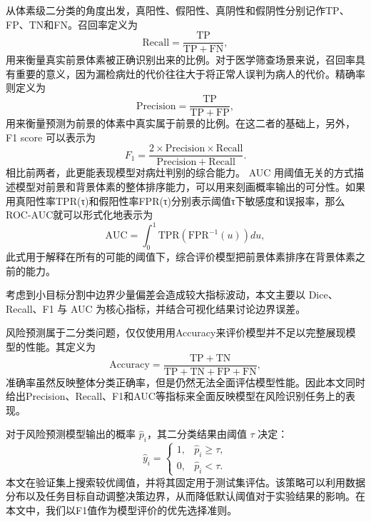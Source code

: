 从体素级二分类的角度出发，真阳性、假阳性、真阴性和假阴性分别记作TP、FP、TN和FN。召回率定义为
\begin{equation}
\mathrm{Recall}=\frac{\mathrm{TP}}{\mathrm{TP}+\mathrm{FN}},
\label{eq:eval-recall}
\end{equation}
用来衡量真实前景体素被正确识别出来的比例。对于医学筛查场景来说，召回率具有重要的意义，因为漏检病灶的代价往往大于将正常人误判为病人的代价。精确率则定义为
\begin{equation}
\mathrm{Precision}=\frac{\mathrm{TP}}{\mathrm{TP}+\mathrm{FP}},
\label{eq:eval-precision}
\end{equation}
用来衡量预测为前景的体素中真实属于前景的比例。在这二者的基础上，另外，F1 score 可以表示为
\begin{equation}
F_1=\frac{2\times \mathrm{Precision}\times \mathrm{Recall}}{\mathrm{Precision}+\mathrm{Recall}}.
\label{eq:eval-f1}
\end{equation}
相比前两者，此更能表现模型对病灶判别的综合能力。
AUC 用阈值无关的方式描述模型对前景和背景体素的整体排序能力，可以用来刻画概率输出的可分性。如果用真阳性率TPR(τ)和假阳性率FPR(τ)分别表示阈值τ下敏感度和误报率，那么ROC-AUC就可以形式化地表示为
\begin{equation}
\mathrm{AUC}=\int_{0}^{1}\mathrm{TPR}\left(\mathrm{FPR}^{-1}(u)\right)du,
\label{eq:eval-auc}
\end{equation}
此式用于解释在所有的可能的阈值下，综合评价模型把前景体素排序在背景体素之前的能力。

考虑到小目标分割中边界少量偏差会造成较大指标波动，本文主要以 Dice、Recall、F1 与 AUC 为核心指标，并结合可视化结果讨论边界误差。

风险预测属于二分类问题，仅仅使用用Accuracy来评价模型并不足以完整展现模型的性能。其定义为
\begin{equation}
\mathrm{Accuracy}=\frac{\mathrm{TP}+\mathrm{TN}}{\mathrm{TP}+\mathrm{TN}+\mathrm{FP}+\mathrm{FN}},
\label{eq:accuracy}
\end{equation}
准确率虽然反映整体分类正确率，但是仍然无法全面评估模型性能。因此本文同时给出Precision、Recall、F1和AUC等指标来全面反映模型在风险识别任务上的表现。

对于风险预测模型输出的概率 $\hat{p}_i$，其二分类结果由阈值 $\tau$ 决定：
\begin{equation}
\hat{y}_i=
\begin{cases}
1, & \hat{p}_i\geq \tau,\\
0, & \hat{p}_i<\tau.
\end{cases}
\label{eq:risk-threshold}
\end{equation}
本文在验证集上搜索较优阈值，并将其固定用于测试集评估。该策略可以利用数据分布以及任务目标自动调整决策边界，从而降低默认阈值对于实验结果的影响。在本文中，我们以F1值作为模型评价的优先选择准则。

